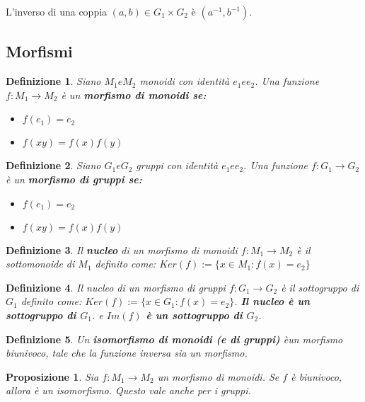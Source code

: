 \documentclass[a4paper,12pt]{article}
\theoremstyle{def}
\newtheorem*{definition}{Definizione}
\theoremstyle{prop}
\newtheorem*{proposition}{Proposizione}
\theoremstyle{esempio}
\theoremstyle{dimostrazione}
\theoremstyle{teo}
\theoremstyle{osservazione}
\begin{document}
L'inverso di una coppia \((a,b) \in G_1 \times G_2\) è \((a^{-1},b^{-1})\).

\subsection{Morfismi}

\begin{definition}
    Siano \(M_1 e M_2\) monoidi con identità \(e_1 e e_2\). Una funzione \(f : M_1 \rightarrow M_2\) è un
    \textbf{morfismo di monoidi se:}
    \
    \begin{itemize}
        \item \(f(e_1) = e_2\)
        \item \(f(xy) = f(x)f(y)\)
    \end{itemize}
\end{definition}

\begin{definition}
    Siano \(G_1 e G_2\) gruppi con identità \(e_1 e e_2\). Una funzione \(f : G_1 \rightarrow G_2\) è un
    \textbf{morfismo di gruppi se:}
    \
    \begin{itemize}
        \item \(f(e_1) = e_2\)
        \item \(f(xy) = f(x)f(y)\)
    \end{itemize}
\end{definition}


\begin{definition}
    Il \textbf{nucleo} di un morfismo di monoidi \(f: M_1 \rightarrow M_2\) è il sottomonoide di \(M_1\)
    definito come: \(Ker(f):= \{x \in M_1 : f(x) = e_2\}\)
\end{definition}

\begin{definition}
    Il nucleo di un morfismo di gruppi \(f: G_1 \rightarrow G_2\) è il sottogruppo di \(G_1\) definito
    come: \(Ker(f):= \{x \in G_1 : f(x) = e_2\}\). \textbf{Il nucleo è un sottogruppo di \(G_1\)}. e
    \textbf{\(Im(f)\) è un sottogruppo di \(G_2\)}.
\end{definition}

\begin{definition}
    Un \textbf{isomorfismo di monoidi (e di gruppi)} èun morfismo biunivoco, tale che la funzione inversa sia un morfismo.
\end{definition}


\begin{proposition}
    Sia \(f: M_1 \rightarrow M_2\) un morfismo di monoidi. Se \(f\) è biunivoco, allora è un isomorfismo.
    Questo vale anche per i gruppi.
\end{proposition}
\end{document}
